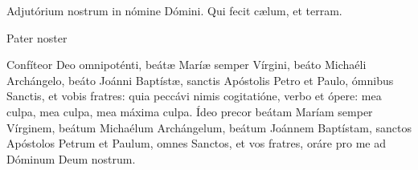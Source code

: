 \documentclass[a4paper, twoside, 12pt]{article}
\begin{document}
\trOrationis

\vspace{1cm}
\vspace{2mm}





\vfill
\pagebreak




\trJubeDomne

\vfill



\trComplBenedictio

\vfill

 


\trComplLectioBr

\vfill

\noindent \Vbardot{} Adjutórium nostrum in nómine Dómini. \Rbardot{} Qui fecit cælum, et terram.

\vfill

\noindent Pater noster 

\vfill
\pagebreak


\noindent Confíteor Deo omnipoténti, beátæ Maríæ semper Vírgini, beáto
Michaéli Archángelo, beáto Joánni Baptístæ, sanctis Apóstolis Petro
et Paulo, ómnibus Sanctis, et vobis fratres: quia peccávi nimis cogitatióne,
verbo et ópere: mea culpa, mea culpa, mea máxima culpa.
Ídeo precor beátam Maríam semper Vírginem, beátum Michaélum
Archángelum, beátum Joánnem Baptístam, sanctos Apóstolos Petrum
et Paulum, omnes Sanctos, et vos fratres, oráre pro me ad Dóminum
Deum nostrum.
\end{document}
